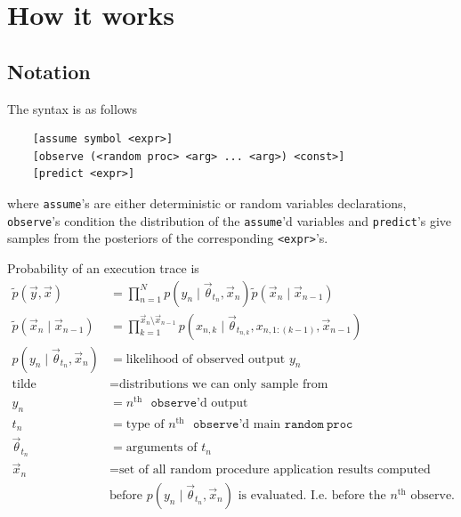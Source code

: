 \section{How it works}
\subsection{Notation}
The syntax is as follows
\begin{verbatim}
	[assume symbol <expr>]
	[observe (<random proc> <arg> ... <arg>) <const>]
	[predict <expr>]
\end{verbatim}
where \verb!assume!'s are either deterministic or random variables declarations, \verb!observe!'s condition the distribution of the \verb!assume!'d variables and \verb!predict!'s give samples from the posteriors of the corresponding \verb!<expr>!'s.

Probability of an execution trace is
\begin{align}
	\tilde p(\vec y, \vec x) 				&= \prod_{n = 1}^N p(y_n \mid \vec \theta_{t_n}, \vec x_n) \tilde p(\vec x_n \mid \vec x_{n - 1}) \\
	\tilde p(\vec x_n \mid \vec x_{n - 1}) 	&= \prod_{k = 1}^{\vec x_n \setminus \vec x_{n - 1}} p(x_{n, k} \mid \vec \theta_{t_{n, k}}, x_{n, 1:(k - 1)}, \vec x_{n - 1}) \\
	p(y_n \mid \vec \theta_{t_n}, \vec x_n)	&= \text{likelihood of observed output } y_n \\
	\text{tilde}							&= \text{distributions we can only sample from} \\
	y_n										&= n^{\text{th}} \text{ }\mathtt{observe}\text{'d output} \\
	t_n										&= \text{type of } n^{\text{th}} \text{ }\mathtt{observe}\text{'d main }\mathtt{random\ proc} \\
	\vec \theta_{t_n}						&= \text{arguments of } t_n \\
	\vec x_n								&= \text{set of all random procedure application results computed } \nonumber\\
											&\text{before }p(y_n \mid \vec \theta_{t_n}, \vec x_n) \text{ is evaluated. I.e. before the } n^{\text{th}} \text{ observe.}
\end{align}

